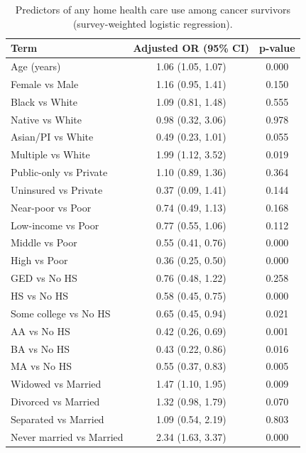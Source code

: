 
\begin{longtable}[t]{lcc}
\caption{\label{tab:tab:use-cancer}Predictors of any home health care use among cancer survivors (survey-weighted logistic regression).}\\
\toprule
Term & Adjusted OR (95\% CI) & p-value\\
\midrule
Age (years) & 1.06 (1.05, 1.07) & 0.000\\
Female vs Male & 1.16 (0.95, 1.41) & 0.150\\
Black vs White & 1.09 (0.81, 1.48) & 0.555\\
Native vs White & 0.98 (0.32, 3.06) & 0.978\\
Asian/PI vs White & 0.49 (0.23, 1.01) & 0.055\\
\addlinespace
Multiple vs White & 1.99 (1.12, 3.52) & 0.019\\
Public-only vs Private & 1.10 (0.89, 1.36) & 0.364\\
Uninsured vs Private & 0.37 (0.09, 1.41) & 0.144\\
Near-poor vs Poor & 0.74 (0.49, 1.13) & 0.168\\
Low-income vs Poor & 0.77 (0.55, 1.06) & 0.112\\
\addlinespace
Middle vs Poor & 0.55 (0.41, 0.76) & 0.000\\
High vs Poor & 0.36 (0.25, 0.50) & 0.000\\
GED vs No HS & 0.76 (0.48, 1.22) & 0.258\\
HS vs No HS & 0.58 (0.45, 0.75) & 0.000\\
Some college vs No HS & 0.65 (0.45, 0.94) & 0.021\\
\addlinespace
AA vs No HS & 0.42 (0.26, 0.69) & 0.001\\
BA vs No HS & 0.43 (0.22, 0.86) & 0.016\\
MA vs No HS & 0.55 (0.37, 0.83) & 0.005\\
Widowed vs Married & 1.47 (1.10, 1.95) & 0.009\\
Divorced vs Married & 1.32 (0.98, 1.79) & 0.070\\
\addlinespace
Separated vs Married & 1.09 (0.54, 2.19) & 0.803\\
Never married vs Married & 2.34 (1.63, 3.37) & 0.000\\
\bottomrule
\end{longtable}
